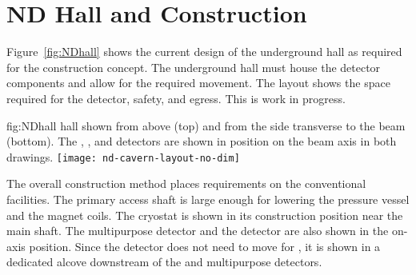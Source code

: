 
\chapter{ND Hall and Construction}
\label{sec:appx-nd:exsum-nd-hall}
%

Figure~\ref{fig:NDhall} shows the current design of the underground hall as required for the   construction concept. The underground hall must house the detector components and allow for the required movement. The layout shows the space required for the detector, safety, and egress.  This is work in progress. 

\begin{dunefigure}{fig:NDhall}
{   hall shown from above (top) and from the side transverse to the beam (bottom). The , , and  detectors are shown in position on the beam axis in both drawings. }
\texttt{[image: nd-cavern-layout-no-dim]}
\end{dunefigure}

The overall construction method places requirements on the conventional facilities. 
The primary access shaft is large enough for lowering the pressure vessel and the magnet coils. The  cryostat is shown in its construction position near the main shaft. The multipurpose detector and the  detector are also shown in the on-axis position. Since the  detector does not need to move for , it is shown in a dedicated alcove downstream of the  and multipurpose detectors.





